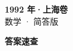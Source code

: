 \documentclass[zihao=-4, a4paper]{ctexart}
\begin{document}
\begin{center}
  {\Large\bfseries 1992 年·上海卷}\\[4pt]
  {\large 数学 · 简答版}
\end{center}
\medskip
{}

\clearpage
{}
\begin{center}{\Large\bfseries 答案速查}\end{center}
\medskip

\end{document}
